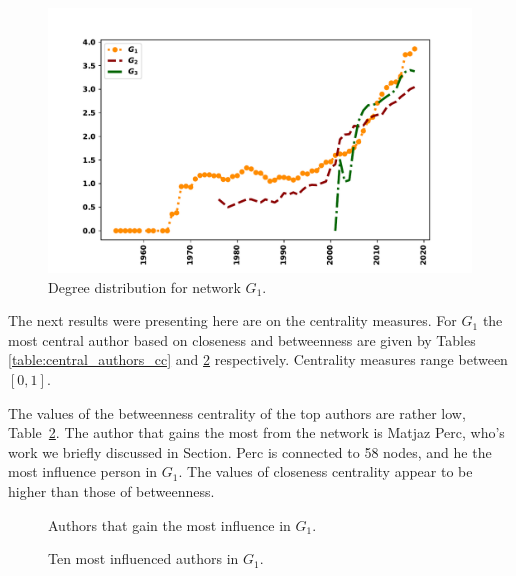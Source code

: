 \documentclass{article}
\theoremstyle{definition}
\begin{document}
\begin{figure}[!hbtp]
    \centering
    \includegraphics[width=.7\textwidth]{./assets/images/degrees_over_time.pdf}
    \caption{Degree distribution for network \(G_1\).}\label{fig:degree_distr_cumu}
\end{figure}

\begin{table}[!hbtp]
    \centering
    \begin{adjustbox}{totalheight=\baselineskip}
    }
    \caption{Collaborativeness metrics for cumulative graphs.}\label{table:coll_cumulative}
\end{adjustbox}
\end{table}

The next results were presenting here are on the centrality measures. For \(G_1\)
the most central author based on closeness and betweenness are given by Tables
\ref{table:central_authors_cc} and \ref{table:central_authors} respectively.
Centrality measures range between \([0, 1]\).

The values of the betweenness centrality of the top authors are rather low,
Table~\ref{table:central_authors}.
The author that gains the most from the network is Matjaz Perc, who's work we
briefly discussed in Section. Perc is connected to 58 nodes, and
he the most influence person in \(G_1\). The values of closeness centrality
appear to be higher than those of betweenness.

\begin{figure}[!hbtp]
    \begin{minipage}{.45\textwidth}
        \centering
        
        \caption{Authors that gain the most influence in \(G_1\).}\label{table:central_authors_cc}
    \end{minipage}%
    \begin{minipage}{.45\textwidth}
        \centering
        
        \caption{Ten most influenced authors in \(G_1\).}\label{table:central_authors}
    \end{minipage}
\end{figure}
\end{document}

